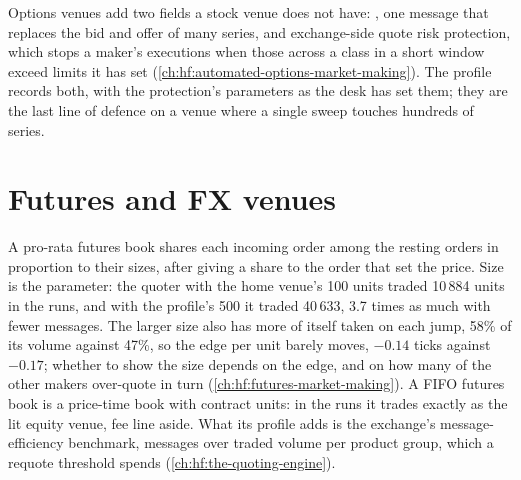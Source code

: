 Options venues add two fields a stock venue does not have: , one message that replaces the bid and offer of many series, and
exchange-side quote risk protection, which stops a maker's executions when those across a class in a short window exceed limits it has set
(\cref{ch:hf:automated-options-market-making}). The profile records both, with the protection's parameters as the desk has set them; they are the
last line of defence on a venue where a single sweep touches hundreds of series.

\section{Futures and FX venues}

A pro-rata futures book shares each incoming order among the resting orders in proportion to their sizes, after giving a share to the order that
set the price. Size is the parameter: the quoter with the home venue's 100 units traded 10\,884 units in the runs, and with the profile's 500 it traded
40\,633, 3.7 times as much with fewer messages. The larger size also has more of itself taken on each jump, 58\% of its volume against 47\%, so the
edge per unit barely moves, $-0.14$ ticks against $-0.17$; whether to show the size depends on the edge, and on how many of the other makers
over-quote in turn (\cref{ch:hf:futures-market-making}). A FIFO futures book is a price-time book with contract units: in the runs it trades
exactly as the lit equity venue, fee line aside. What its profile adds is the exchange's message-efficiency benchmark, messages over traded volume
per product group, which a requote threshold spends (\cref{ch:hf:the-quoting-engine}).

